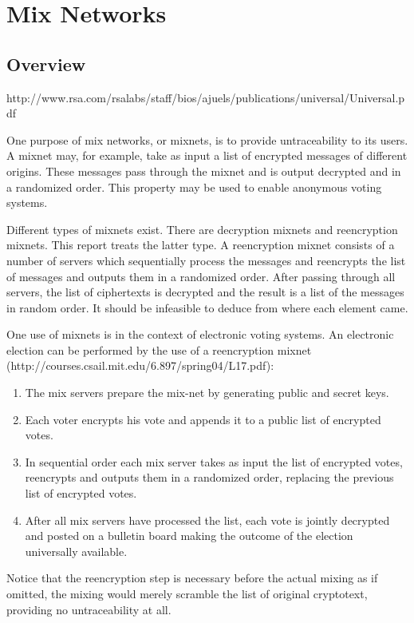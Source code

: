 \section{Mix Networks}

\subsection{Overview}
http://www.rsa.com/rsalabs/staff/bios/ajuels/publications/universal/Universal.pdf

One purpose of mix networks, or mixnets, is to provide untraceability
to its users. A mixnet may, for example, take as input a list of
encrypted messages of different origins. These messages pass through
the mixnet and is output decrypted and in a randomized order. This
property may be used to enable anonymous voting systems.

Different types of mixnets exist. There are decryption mixnets and
reencryption mixnets. This report treats the latter type. A
reencryption mixnet consists of a number of servers which sequentially
process the messages and reencrypts the list of messages and outputs
them in a randomized order. After passing through all servers, the
list of ciphertexts is decrypted and the result is a list of the
messages in random order. It should be infeasible to deduce from where
each element came.

One use of mixnets is in the context of electronic voting systems. An
electronic election can be performed by the use of a reencryption
mixnet \\
(http://courses.csail.mit.edu/6.897/spring04/L17.pdf):
\begin{enumerate}
\item The mix servers prepare the mix-net by generating public and
  secret keys.
\item Each voter encrypts his vote and appends it to a public list of
  encrypted votes.
\item In sequential order each mix server takes as input the list of
  encrypted votes, reencrypts and outputs them in a randomized order,
  replacing the previous list of encrypted votes.
\item After all mix servers have processed the list, each vote is
  jointly decrypted and posted on a bulletin board making the outcome
  of the election universally available.
\end{enumerate}

Notice that the reencryption step is necessary before the actual
mixing as if omitted, the mixing would merely scramble the list of
original cryptotext, providing no untraceability at all.

